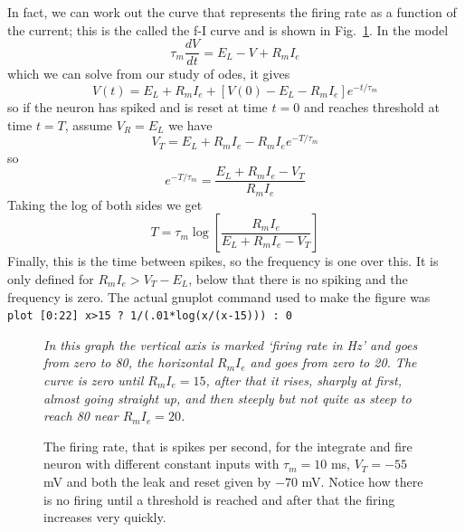 \documentclass[12pt]{article}
\begin{document}
In fact, we can work out the curve that represents the firing rate as
a function of the current; this is the called the f-I curve and is shown in Fig.~\ref{f_i_curve}. In the model
\begin{equation}
\tau_m\frac{dV}{dt}=E_L-V+R_mI_e
\end{equation}
which we can solve from our study of odes, it gives
\begin{equation}
V(t)=E_L+R_mI_e+[V(0)-E_L-R_mI_e]e^{-t/\tau_m}
\end{equation}
so if the neuron has spiked and is reset at time $t=0$ and reaches
threshold at time $t=T$, assume $V_R=E_L$ we have
\begin{equation}
V_T=E_L+R_mI_e-R_mI_ee^{-T/\tau_m}
\end{equation}
so 
\begin{equation}
e^{-T/\tau_m}=\frac{E_L+R_mI_e-V_T}{R_mI_e}
\end{equation}
Taking the log of both sides we get
\begin{equation}
T=\tau_m\log\left[\frac{R_mI_e}{E_L+R_mI_e-V_T}\right]
\end{equation}
Finally, this is the time between spikes, so the frequency is one over this. It is only defined for $R_mI_e>V_T-E_L$, below that there is no spiking and the frequency is zero. The actual gnuplot command used to make the figure was\\
\texttt{plot [0:22] x>15 ? 1/(.01*log(x/(x-15))) : 0}


\begin{figure}
  \begin{center}
    {\textsl{In this graph the vertical axis is marked `firing rate in Hz' and goes from zero to 80, the horizontal $R_mI_e$ and goes from zero to 20. The curve is zero until $R_mI_e=15$, after that it rises, sharply at first, almost going straight up, and then steeply but not quite as steep to reach 80 near $R_mI_e=20$.} }
{
}
  \end{center}
\caption{The firing rate, that is spikes per second, for the integrate
  and fire neuron with different constant inputs with $\tau_m=10$ ms,
  $V_T=-55$ mV and both the leak and reset given by $-70$ mV. Notice
  how there is no firing until a threshold is reached and after that
  the firing increases very quickly. \label{f_i_curve}}
\end{figure}
\end{document}

